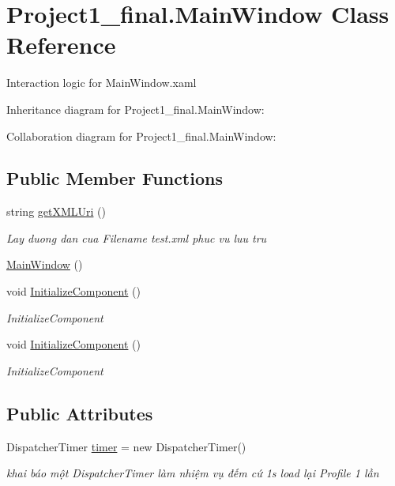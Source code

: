 \hypertarget{class_project1__final_1_1_main_window}{\section{Project1\+\_\+final.\+Main\+Window Class Reference}
\label{class_project1__final_1_1_main_window}
}


Interaction logic for Main\+Window.\+xaml  




Inheritance diagram for Project1\+\_\+final.\+Main\+Window\+:


Collaboration diagram for Project1\+\_\+final.\+Main\+Window\+:
\subsection*{Public Member Functions}
\begin{DoxyCompactItemize}
\item 
string \hyperlink{class_project1__final_1_1_main_window_a48acd4634c5b83aafca97e77a491f0aa}{get\+X\+M\+L\+Uri} ()
\begin{DoxyCompactList}\small\item\em Lay duong dan cua Filename test.\+xml phuc vu luu tru \end{DoxyCompactList}\item 
\hyperlink{class_project1__final_1_1_main_window_a86be661363cfcd5dd772a9e789bdf35c}{Main\+Window} ()
\item 
void \hyperlink{class_project1__final_1_1_main_window_a711e8c9631912e76f7b33eaa103046cc}{Initialize\+Component} ()
\begin{DoxyCompactList}\small\item\em Initialize\+Component \end{DoxyCompactList}\item 
void \hyperlink{class_project1__final_1_1_main_window_a711e8c9631912e76f7b33eaa103046cc}{Initialize\+Component} ()
\begin{DoxyCompactList}\small\item\em Initialize\+Component \end{DoxyCompactList}\end{DoxyCompactItemize}
\subsection*{Public Attributes}
\begin{DoxyCompactItemize}
\item 
Dispatcher\+Timer \hyperlink{class_project1__final_1_1_main_window_ab077e188a47508ffb2ca305eeff6c726}{timer} = new Dispatcher\+Timer()
\begin{DoxyCompactList}\small\item\em khai báo một Dispatcher\+Timer làm nhiệm vụ đếm cứ 1s load lại Profile 1 lần \end{DoxyCompactList}\end{DoxyCompactItemize}


